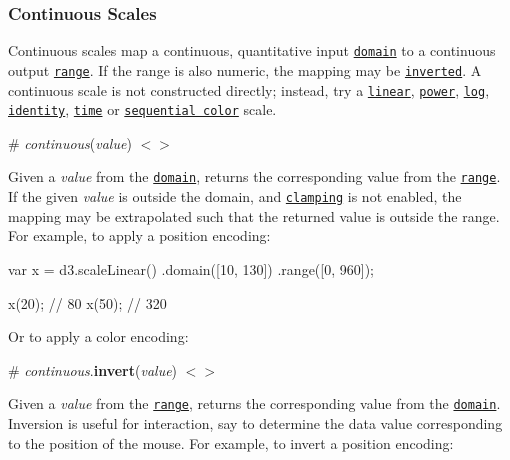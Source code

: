 \subsubsection*{Continuous Scales}

Continuous scales map a continuous, quantitative input \href{#continuous_domain}{\tt domain} to a continuous output \href{#continuous_range}{\tt range}. If the range is also numeric, the mapping may be \href{#continuous_invert}{\tt inverted}. A continuous scale is not constructed directly; instead, try a \href{#linear-scales}{\tt linear}, \href{#power-scales}{\tt power}, \href{#log-scales}{\tt log}, \href{#identity-scales}{\tt identity}, \href{#time-scales}{\tt time} or \href{#sequential-scales}{\tt sequential color} scale.

\label{__continuous}%
\# {\itshape continuous}({\itshape value}) \href{https://github.com/d3/d3-scale/blob/master/src/continuous.js#L69}{\tt $<$$>$}

Given a {\itshape value} from the \href{#continuous_domain}{\tt domain}, returns the corresponding value from the \href{#continuous_range}{\tt range}. If the given {\itshape value} is outside the domain, and \href{#continuous_clamp}{\tt clamping} is not enabled, the mapping may be extrapolated such that the returned value is outside the range. For example, to apply a position encoding\+:


\begin{DoxyCode}
var x = d3.scaleLinear()
    .domain([10, 130])
    .range([0, 960]);

x(20); // 80
x(50); // 320
\end{DoxyCode}


Or to apply a color encoding\+:




\label{_continuous_invert}%
\# {\itshape continuous}.{\bfseries invert}({\itshape value}) \href{https://github.com/d3/d3-scale/blob/master/src/continuous.js#L88}{\tt $<$$>$}

Given a {\itshape value} from the \href{#continuous_range}{\tt range}, returns the corresponding value from the \href{#continuous_domain}{\tt domain}. Inversion is useful for interaction, say to determine the data value corresponding to the position of the mouse. For example, to invert a position encoding\+:


